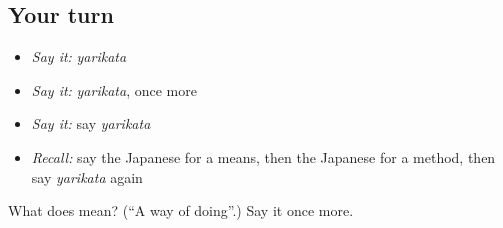 \subsection*{Your turn}
\begin{itemize}
\raggedright
  \item \emph{Say it:} \emph{yarikata}
  \item \emph{Say it:} \emph{yarikata}, once more
  \item \emph{Say it:} say \emph{yarikata}
  \item \emph{Recall:} say the Japanese for a means, then the Japanese for a method, then say \emph{yarikata} again
\end{itemize}

\begin{tcolorbox}[breakable,colback=teal!4,colframe=teal!35!black,title={Before you move on}]
What does  mean? (\textquotedblleft{}A way of doing\textquotedblright{}.) Say it once more.
\end{tcolorbox}
